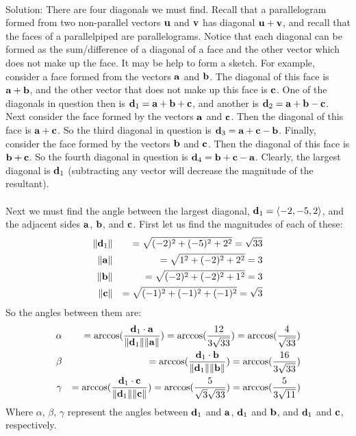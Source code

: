 \documentclass[12pt]{amsbook}
\newcommand{\la}{\langle}
\newcommand{\ra}{\rangle}
\begin{document}
\\
{\sc Solution}:
There are four diagonals we must find. Recall that a parallelogram formed from two non-parallel vectors $\bf u$ and $\bf v$ has diagonal $\bf u+v$, and recall that the faces of a parallelpiped are parallelograms. Notice that each diagonal can be formed as the sum/difference of a diagonal of a face and the other vector which does not make up the face. It may be help to form a sketch. For example, consider a face formed from the vectors $\bf a$ and $\bf b$. The diagonal of this face is $\bf a+b$, and the other vector that does not make up this face is $\bf c$. One of the diagonals in question then is ${\bf d}_1=\bf a+b+c$, and another is ${\bf d}_2=\bf a+b-c$. Next consider the face formed by the vectors $\bf a$ and $\bf c$. Then the diagonal of this face is $\bf a+c$. So the third diagonal in question is ${\bf d}_3=\bf a+c-b$. Finally, consider the face formed by the vectors $\bf b$ and $\bf c$. Then the diagonal of this face is $\bf b+c$. So the fourth diagonal in question is ${\bf d}_4=\bf b+c-a$. Clearly, the largest diagonal is ${\bf d}_1$ (subtracting any vector will decrease the magnitude of the resultant). 
\\
\\
Next we must find the angle between the largest diagonal, ${\bf d}_1=\la -2, -5, 2 \ra$, and the adjacent sides $\bf a$, $\bf b$, and $\bf c$. First let us find the magnitudes of each of these:
\begin{eqnarray*}
\|{\bf d}_1\|&&=\sqrt{(-2)^2+(-5)^2+2^2}=\sqrt{33}\\
\|{\bf a}\|&&=\sqrt{1^2+(-2)^2+2^2}=3\\
\|{\bf b}\|&&=\sqrt{(-2)^2+(-2)^2+1^2}=3\\
\|{\bf c}\|&&=\sqrt{(-1)^2+(-1)^2+(-1)^2}=\sqrt{3}
\end{eqnarray*}
So the angles between them are:
\begin{eqnarray*}
\alpha&&=\arccos(\frac{{\bf d}_1\cdot{\bf a}}{\|{\bf d}_1\|\|{\bf a}\|})=\arccos(\frac{12}{3\sqrt{33}})=\arccos(\frac{4}{\sqrt{33}})\\
\beta&&=\arccos(\frac{{\bf d}_1\cdot{\bf b}}{\|{\bf d}_1\|\|{\bf b}\|})=\arccos(\frac{16}{3\sqrt{33}})\\
\gamma&&=\arccos(\frac{{\bf d}_1\cdot{\bf c}}{\|{\bf d}_1\|\|{\bf c}\|})=\arccos(\frac{5}{\sqrt{3}\sqrt{33}})=\arccos(\frac{5}{3\sqrt{11}})
\end{eqnarray*}
Where $\alpha$, $\beta$, $\gamma$ represent the angles between ${\bf d}_1$ and $\bf a$, ${\bf d}_1$ and $\bf b$, and ${\bf d}_1$ and $\bf c$, respectively.
\end{document}
